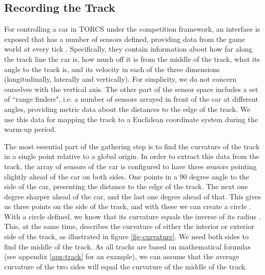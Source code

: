 \documentclass[conference]{IEEEtran}
\begin{document}
\subsection{Recording the Track}
For controlling a car in TORCS under the competition framework, an interface is exposed that has a number of sensors defined, providing data from the game world at every tick \cite{manual}. Specifically, they contain information about how far along the track line the car is, how much off it is from the middle of the track, what its angle to the track is, and its velocity in each of the three dimensions (longitudinally, laterally and vertically). For simplicity, we do not concern ourselves with the vertical axis. The other part of the sensor space includes a set of ``range finders", i.e. a number of sensors arrayed in front of the car at different angles, providing metric data about the distances to the edge of the track. We use this data for mapping the track to a Euclidean coordinate system during the warm-up period.

The most essential part of the gathering step is to find the curvature of the track in a single point relative to a global origin. In order to extract this data from the track, the array of sensors of the car is configured to have three sensors pointing slightly ahead of the car on both sides. One points in a 90 degree angle to the side of the car, presenting the distance to the edge of the track. The next one degree sharper ahead of the car, and the last one degree ahead of that. This gives us three points on the side of the track, and with these we can create a circle \cite{circle}. With a circle defined, we know that its curvature equals the inverse of its radius \cite{curve}. This, at the same time, describes the curvature of either the interior or exterior side of the track, as illustrated in figure \ref{fig-curvature}. We need both sides to find the middle of the track. As all tracks are based on mathematical formulas (see appendix \ref{apx-track} for an example), we can assume that the average curvature of the two sides will equal the curvature of the middle of the track.
\end{document}
